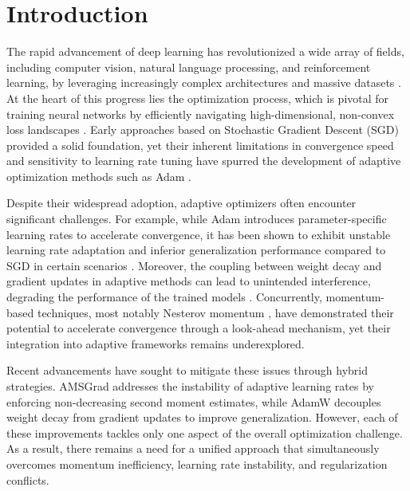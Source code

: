 \documentclass{article}
\begin{document}
\section{Introduction}
\label{sec:introduction}

The rapid advancement of deep learning has revolutionized a wide array of fields, including computer vision, natural language processing, and reinforcement learning, by leveraging increasingly complex architectures and massive datasets \cite{He2016, Vaswani2017}. At the heart of this progress lies the optimization process, which is pivotal for training neural networks by efficiently navigating high-dimensional, non-convex loss landscapes \cite{Goodfellow2016}. Early approaches based on Stochastic Gradient Descent (SGD) \cite{Robbins1951} provided a solid foundation, yet their inherent limitations in convergence speed and sensitivity to learning rate tuning have spurred the development of adaptive optimization methods such as Adam \cite{Kingma2014}.

Despite their widespread adoption, adaptive optimizers often encounter significant challenges. For example, while Adam introduces parameter-specific learning rates to accelerate convergence, it has been shown to exhibit unstable learning rate adaptation and inferior generalization performance compared to SGD in certain scenarios \cite{Wilson2017, Loshchilov2017}. Moreover, the coupling between weight decay and gradient updates in adaptive methods can lead to unintended interference, degrading the performance of the trained models \cite{Loshchilov2017}. Concurrently, momentum-based techniques, most notably Nesterov momentum \cite{nesterov1983method}, have demonstrated their potential to accelerate convergence through a look-ahead mechanism, yet their integration into adaptive frameworks remains underexplored.

Recent advancements have sought to mitigate these issues through hybrid strategies. AMSGrad \cite{Reddi2018} addresses the instability of adaptive learning rates by enforcing non-decreasing second moment estimates, while AdamW decouples weight decay from gradient updates to improve generalization. However, each of these improvements tackles only one aspect of the overall optimization challenge. As a result, there remains a need for a unified approach that simultaneously overcomes momentum inefficiency, learning rate instability, and regularization conflicts.
\end{document}
